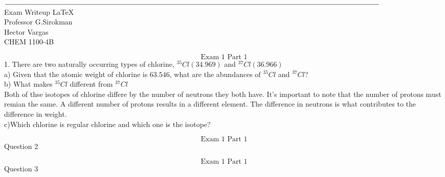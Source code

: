 \documentclass{article}
\begin{document}
    \thispagestyle{empty}
    \begin{center}
        $\line(1,0){525}$\\
        Exam Writeup \LaTeX\\
        Professor G.Sirokman\\
        Hector Vargas\\
        CHEM 1100-4B\\
    \end{center}
    \pagebreak


    $$\text{Exam 1 Part 1}$$
    1. There are two naturally occurring types of chlorine, ${}^{35}Cl (34.969)$ and ${}^{37}Cl (36.966)$\\
    a) Given that the atomic weight of chlorine is $63.546$, what are the abundances of ${}^{35}Cl$ and ${}^{37}Cl$?\\
    $$ $$
    b) What makes ${}^{35}Cl$ different from ${}^{37}Cl$\\
    Both of thse isotopes of chlorine differe by the number of neutrons they both have. It's important to note that the number of protons must remian the same. A different number of protons results in a different element. The difference in neutrons is what contributes to the difference in weight.\\
    c)Which chlorine is regular chlorine and which one is the isotope?\\

    \pagebreak

    $$\text{Exam 1 Part 1}$$
    Question 2
    \pagebreak

    $$\text{Exam 1 Part 1}$$
    Question 3
    \pagebreak

\end{document}
